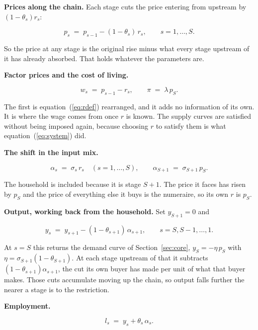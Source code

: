 \documentclass[11pt,a4paper]{article}
\begin{document}
\textbf{Prices along the chain.} Each stage cuts the price entering from upstream by $(1-\theta_s) r_s$:

\begin{equation}
p_s \;=\; p_{s-1} - (1-\theta_s)\, r_s , \qquad s = 1, \dots, S .
\end{equation}

So the price at any stage is the original rise minus what every stage upstream of it has already absorbed. That holds whatever the parameters are.

\textbf{Factor prices and the cost of living.}

\begin{equation}
w_s \;=\; p_{s-1} - r_s , \qquad \pi \;=\; \lambda\, p_S .
\end{equation}

The first is equation~(\ref{eq:rdef}) rearranged, and it adds no information of its own. It is where the wage comes from once $r$ is known. The supply curves are satisfied without being imposed again, because choosing $r$ to satisfy them is what equation~(\ref{eq:system}) did.

\textbf{The shift in the input mix.}

\begin{equation}
\alpha_s \;=\; \sigma_s\, r_s \quad (s = 1, \dots, S) ,
\qquad
\alpha_{S+1} \;=\; \sigma_{S+1}\, p_S .
\end{equation}

The household is included because it is stage $S+1$. The price it faces has risen by $p_S$ and the price of everything else it buys is the numeraire, so its own $r$ is $p_S$.

\textbf{Output, working back from the household.} Set $y_{S+1} = 0$ and

\begin{equation}
y_s \;=\; y_{s+1} - (1-\theta_{s+1})\, \alpha_{s+1} , \qquad s = S, S-1, \dots, 1 .
\end{equation}

At $s = S$ this returns the demand curve of Section~\ref{sec:core}, $y_S = -\eta\, p_S$ with $\eta = \sigma_{S+1}(1-\theta_{S+1})$. At each stage upstream of that it subtracts $(1-\theta_{s+1})\alpha_{s+1}$, the cut its own buyer has made per unit of what that buyer makes. Those cuts accumulate moving up the chain, so output falls further the nearer a stage is to the restriction.

\textbf{Employment.}

\begin{equation}
l_s \;=\; y_s + \theta_s\, \alpha_s .
\end{equation}
\end{document}

